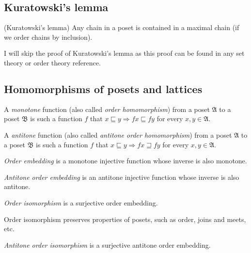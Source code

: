 \subsection{Kuratowski's lemma}
\begin{thm}
(Kuratowski's lemma) Any chain in a poset is contained in a maximal
chain (if we order chains by inclusion).
\end{thm}
I will skip the proof of Kuratowski's lemma as this proof can be found
in any set theory or order theory reference.


\subsection{Homomorphisms of posets and lattices}
\begin{defn}
A \emph{monotone} function
(also called \emph{order homomorphism}) from a poset $\mathfrak{A}$
to a poset $\mathfrak{B}$ is such a function $f$ that $x\sqsubseteq y\Rightarrow fx\sqsubseteq fy$
for every $x,y\in\mathfrak{A}$.
\end{defn}

\begin{defn}
A \emph{antitone} function (also called \emph{antitone
order homomorphism}) from a poset $\mathfrak{A}$ to a poset $\mathfrak{B}$
is such a function $f$ that $x\sqsubseteq y\Rightarrow fx\sqsupseteq fy$
for every $x,y\in\mathfrak{A}$.
\end{defn}

\begin{defn}
\emph{Order embedding} is a monotone injective
function whose inverse is also monotone.
\end{defn}

\begin{defn}
\emph{Antitone order embedding} is
an antitone injective function whose inverse is also antitone.
\end{defn}

\begin{defn}
\emph{Order isomorphism} is a surjective
order embedding.
\end{defn}
Order isomorphism preserves properties of posets, such as order, joins
and meets, etc.
\begin{defn}
\emph{Antitone order isomorphism}
is a surjective antitone order embedding.
\end{defn}

